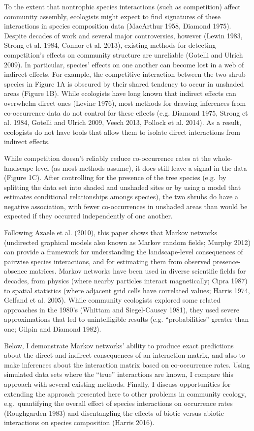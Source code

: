 \documentclass[12pt,]{article}
\begin{document}
\begin{spacing}{1.9}
\begin{flushleft}
\noindent
To the extent that nontrophic species interactions (such as competition)
affect community assembly, ecologists might expect to find signatures of
these interactions in species composition data (MacArthur 1958, Diamond
1975). Despite decades of work and several major controversies, however
(Lewin 1983, Strong et al. 1984, Connor et al. 2013), existing methods
for detecting competition's effects on community structure are
unreliable (Gotelli and Ulrich 2009). In particular, species' effects on
one another can become lost in a web of indirect effects. For example,
the competitive interaction between the two shrub species in Figure 1A
is obscured by their shared tendency to occur in unshaded areas (Figure
1B). While ecologists have long known that indirect effects can
overwhelm direct ones (Levine 1976), most methods for drawing inferences
from co-occurrence data do not control for these effects (e.g. Diamond
1975, Strong et al. 1984, Gotelli and Ulrich 2009, Veech 2013, Pollock
et al. 2014). As a result, ecologists do not have tools that allow them
to isolate direct interactions from indirect effects.

While competition doesn't reliably reduce co-occurrence rates at the
whole-landscape level (as most methods assume), it does still leave a
signal in the data (Figure 1C). After controlling for the presence of
the tree species (e.g.~by splitting the data set into shaded and
unshaded sites or by using a model that estimates conditional
relationships amongs species), the two shrubs do have a negative
association, with fewer co-occurrences in unshaded areas than would be
expected if they occurred independently of one another.

Following Azaele et al. (2010), this paper shows that Markov networks
(undirected graphical models also known as Markov random fields; Murphy
2012) can provide a framework for understanding the landscape-level
consequences of pairwise species interactions, and for estimating them
from observed presence-absence matrices. Markov networks have been used
in diverse scientific fields for decades, from physics (where nearby
particles interact magnetically; Cipra 1987) to spatial statistics
(where adjacent grid cells have correlated values; Harris 1974, Gelfand
et al. 2005). While community ecologists explored some related
approaches in the 1980's (Whittam and Siegel-Causey 1981), they used
severe approximations that led to unintelligible results (e.g.
``probabilities'' greater than one; Gilpin and Diamond 1982).

Below, I demonstrate Markov networks' ability to produce exact
predictions about the direct and indirect consequences of an interaction
matrix, and also to make inferences about the interaction matrix based
on co-occurrence rates. Using simulated data sets where the ``true''
interactions are known, I compare this approach with several existing
methods. Finally, I discuss opportunities for extending the approach
presented here to other problems in community ecology, e.g.~quantifying
the overall effect of species interactions on occurrence rates
(Roughgarden 1983) and disentangling the effects of biotic versus
abiotic interactions on species composition (Harris 2016).


\end{flushleft}
\end{spacing}
\end{document}
